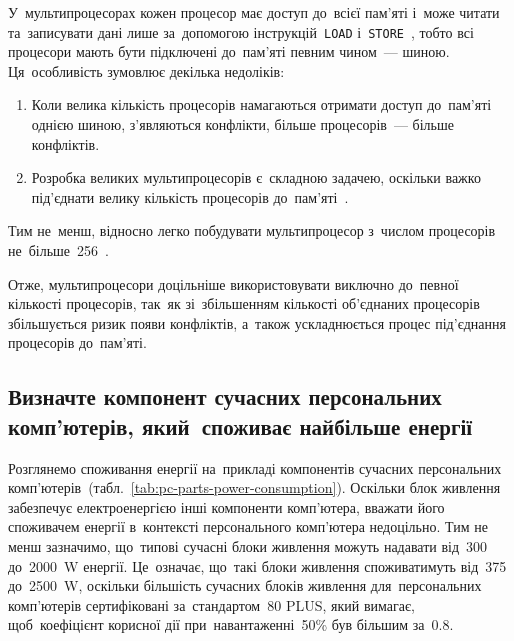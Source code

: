 \documentclass[
	a4paper,
	oneside,
	BCOR = 10mm,
	DIV = 12,
	12pt,
	headings = normal,
	bibliography = totoc,
]{scrartcl}
\begin{document}
			У~мультипроцесорах кожен процесор має доступ до~всієї пам'\-я\-ті і~може читати та~записувати дані лише за~допомогою інструкцій~\texttt{LOAD} і~\texttt{STORE}~\cite[586]{tanenbaum-structured-comp-org}, тобто всі процесори мають бути підключені до~пам'яті певним чином~— шиною. Ця~особливість зумовлює декілька недоліків: 
			\begin{enumerate}[itemsep = 1\baselineskip]
				\item Коли велика кількість процесорів намагаються отримати доступ до~пам'\-я\-ті однією шиною, з'я\-вля\-ються конфлікти, більше процесорів~— більше конфліктів. 
				\item Розробка великих мультипроцесорів є~складною задачею, оскільки важко під'\-єд\-на\-ти велику кількість процесорів до~пам'\-ят\-і~\cite[73]{tanenbaum-structured-comp-org}. 
			\end{enumerate}
			Тим не~менш, відносно легко побудувати мультипроцесор з~числом процесорів не~більше~256~\cite[73]{tanenbaum-structured-comp-org}. 
			
			Отже, мультипроцесори доцільніше використовувати виключно до~певної кількості процесорів, так~як зі~збільшенням кількості об'\-єд\-на\-них процесорів збільшується ризик появи конфліктів, а~також ускладнюється процес під'\-єд\-на\-ння процесорів до~пам'яті. 
		
		\subsection{Визначте компонент сучасних персональних комп'ютерів, який~споживає найбільше енергії}

			Розглянемо споживання енергії на~прикладі компонентів сучасних персональних комп'\-ю\-те\-рів~(табл.~\ref{tab:pc-parts-power-consumption}). Оскільки блок живлення забезпечує електроенергією інші компоненти ком\-п'\-ю\-те\-ра, вважати його споживачем енергії в~контексті персонального ком\-п'\-ю\-те\-ра недоцільно. Тим не менш зазначимо, що~типові сучасні блоки живлення можуть надавати від~300 до~2000~\si{\watt} енергії. Це~означає, що~такі блоки живлення споживатимуть від~375 до~2500~\si{\watt}, оскільки більшість сучасних блоків живлення для~персональних комп'ютерів сертифіковані за~стандартом~\textenglish{80 PLUS}, який вимагає, щоб~коефіцієнт корисної дії при~навантаженні~50\% був більшим за~\num{0.8}. 
\end{document}
